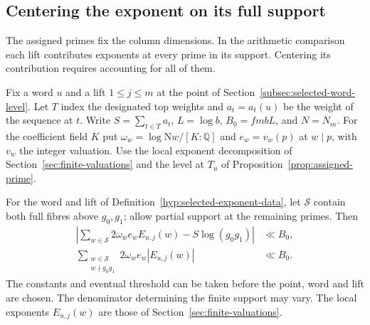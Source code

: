 \subsection{Centering the exponent on its full support}
\label{subsec:selected-exponent}

The assigned primes fix the column dimensions. In the arithmetic comparison each lift contributes exponents at every prime in its support. Centering its contribution requires accounting for all of them.

\begin{paramdefinition}\label{hyp:selected-exponent-data}
Fix a word \(u\) and a lift \(1\le j\le m\) at the point of
Section~\ref{subsec:selected-word-level}. Let \(T\) index the designated top weights and \(a_t=a_t(u)\) be the weight of the sequence at \(t\). Write \(S=\sum_{t\in T}a_t\),
\(L=\log b\), \(B_0=fmbL\), and \(N=N_m\). For the coefficient field
\(K\) put \(\omega_w=\log\mathrm Nw/[K:\mathbb Q]\) and
\(e_w=v_w(p)\) at \(w\mid p\), with \(v_w\) the integer valuation. Use the local exponent
decomposition of Section~\ref{sec:finite-valuations} and the
level at \(T_u\) of Proposition~\ref{prop:assigned-prime}.
\end{paramdefinition}
\begin{proposition}\label{prop:selected-exponent-centering}
For the word and lift of Definition~\ref{hyp:selected-exponent-data},
let \(\mathcal S\) contain both full fibres above \(g_0,g_1\);
allow partial support at the remaining primes. Then
\begin{align}
 \left|\sum_{w\in\mathcal S}2\omega_w e_w E_{u,j}(w)
               -S\log(g_0g_1)\right|&\ll B_0,\label{eq:selected-exponent-all}\\
 \sum_{\substack{w\in\mathcal S\\w\nmid g_0g_1}}
             2\omega_w e_w |E_{u,j}(w)|&\ll B_0.\label{eq:selected-exponent-away}
\end{align}
The constants and eventual threshold can be taken before the
point, word and lift are chosen. The denominator determining the finite support may vary. The local exponents \(E_{u,j}(w)\) are those of Section~\ref{sec:finite-valuations}. \label{cor:selected-exponent-1}
\end{proposition}

